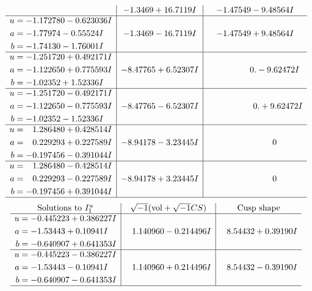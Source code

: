 \documentclass[1p]{elsarticle_modified}
\theoremstyle{definition}
\newcommand{\I}{\sqrt{-1}}
\begin{document}
$$\begin{array}{c|c|c}
 & -1.3469 + 16.7119 I & -1.47549 - 9.48564 I \\ \hline\begin{aligned}
u &= -1.172780 - 0.623036 I \\
a &= -1.77974 - 0.55524 I \\
b &= -1.74130 - 1.76001 I\end{aligned}
 & -1.3469 - 16.7119 I & -1.47549 + 9.48564 I \\ \hline\begin{aligned}
u &= -1.251720 + 0.492171 I \\
a &= -1.122650 + 0.775593 I \\
b &= -1.02352 + 1.52336 I\end{aligned}
 & -8.47765 + 6.52307 I & \phantom{-0.000000 } 0. - 9.62472 I \\ \hline\begin{aligned}
u &= -1.251720 - 0.492171 I \\
a &= -1.122650 - 0.775593 I \\
b &= -1.02352 - 1.52336 I\end{aligned}
 & -8.47765 - 6.52307 I & \phantom{-0.000000 -}0. + 9.62472 I \\ \hline\begin{aligned}
u &= \phantom{-}1.286480 + 0.428514 I \\
a &= \phantom{-}0.229293 + 0.227589 I \\
b &= -0.197456 - 0.391044 I\end{aligned}
 & -8.94178 - 3.23445 I & \phantom{-0.000000 } 0 \\ \hline\begin{aligned}
u &= \phantom{-}1.286480 - 0.428514 I \\
a &= \phantom{-}0.229293 - 0.227589 I \\
b &= -0.197456 + 0.391044 I\end{aligned}
 & -8.94178 + 3.23445 I & \phantom{-0.000000 } 0\\
 \hline 
 \end{array}$$\newpage$$\begin{array}{c|c|c}  
\text{Solutions to }I^u_{1}& \I (\text{vol} + \sqrt{-1}CS) & \text{Cusp shape}\\
 \hline 
\begin{aligned}
u &= -0.445223 + 0.386227 I \\
a &= -1.53443 + 0.10941 I \\
b &= -0.640907 + 0.641353 I\end{aligned}
 & \phantom{-}1.140960 - 0.214496 I & \phantom{-}8.54432 + 0.39190 I \\ \hline\begin{aligned}
u &= -0.445223 - 0.386227 I \\
a &= -1.53443 - 0.10941 I \\
b &= -0.640907 - 0.641353 I\end{aligned}
 & \phantom{-}1.140960 + 0.214496 I & \phantom{-}8.54432 - 0.39190 I\\
 \hline 
 \end{array}$$\newpage\newpage\renewcommand{\arraystretch}{1}
\end{document}
